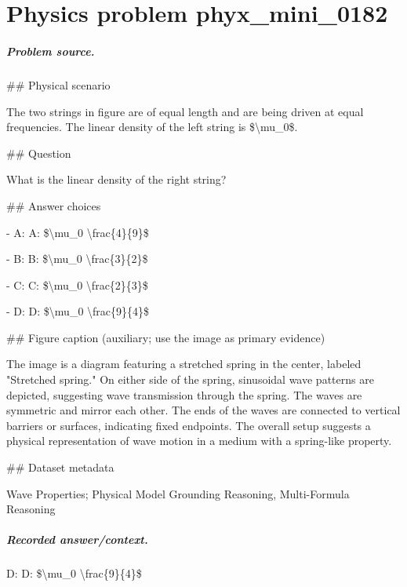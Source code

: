 
\chapter{Physics problem phyx\_mini\_0182}
\label{ch:PhyXMiniProblems_problem_phyx_mini_0182}

\paragraph{Problem source.}
\#\# Physical scenario

The two strings in figure are of equal length and are being driven at equal frequencies. The linear density of the left string is \$\textbackslash{}mu\_0\$.

\#\# Question

What is the linear density of the right string?

\#\# Answer choices

- A: A: \$\textbackslash{}mu\_0 \textbackslash{}frac\{4\}\{9\}\$

- B: B: \$\textbackslash{}mu\_0 \textbackslash{}frac\{3\}\{2\}\$

- C: C: \$\textbackslash{}mu\_0 \textbackslash{}frac\{2\}\{3\}\$

- D: D: \$\textbackslash{}mu\_0 \textbackslash{}frac\{9\}\{4\}\$

\#\# Figure caption (auxiliary; use the image as primary evidence)

The image is a diagram featuring a stretched spring in the center, labeled "Stretched spring." On either side of the spring, sinusoidal wave patterns are depicted, suggesting wave transmission through the spring. The waves are symmetric and mirror each other. The ends of the waves are connected to vertical barriers or surfaces, indicating fixed endpoints. The overall setup suggests a physical representation of wave motion in a medium with a spring-like property.

\#\# Dataset metadata

Wave Properties; Physical Model Grounding Reasoning, Multi-Formula Reasoning

\paragraph{Recorded answer/context.}
D: D: \$\textbackslash{}mu\_0 \textbackslash{}frac\{9\}\{4\}\$

